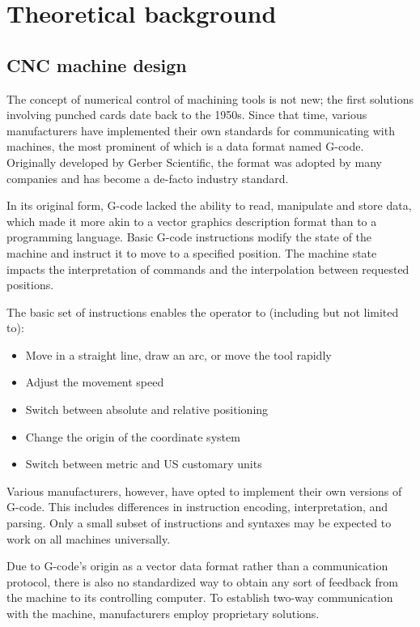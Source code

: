 \clearpage
\section{Theoretical background}

\subsection{CNC machine design}

The concept of numerical control of machining tools is not new; the first
solutions involving punched cards date back to the 1950s. Since that time,
various manufacturers have implemented their own standards for communicating
with machines, the most prominent of which is a data format named G-code.
Originally developed by Gerber Scientific, the format was adopted by many
companies and has become a de-facto industry standard.

In its original form, G-code lacked the ability to read, manipulate and store
data, which made it more akin to a vector graphics description format than to a
programming language. Basic G-code instructions modify the state of the machine
and instruct it to move to a specified position. The machine state impacts the
interpretation of commands and the interpolation between requested positions.

The basic set of instructions enables the operator to (including but not
limited to):
\begin{itemize}
    \item Move in a straight line, draw an arc, or move the tool rapidly
    \item Adjust the movement speed
    \item Switch between absolute and relative positioning
    \item Change the origin of the coordinate system
    \item Switch between metric and US customary units
\end{itemize}
Various manufacturers, however, have opted to implement their own versions of
G-code. This includes differences in instruction encoding, interpretation, and
parsing. Only a small subset of instructions and syntaxes may be expected to
work on all machines universally.

Due to G-code's origin as a vector data format rather than a communication
protocol, there is also no standardized way to obtain any sort of feedback from
the machine to its controlling computer. To establish two-way communication
with the machine, manufacturers employ proprietary solutions.

